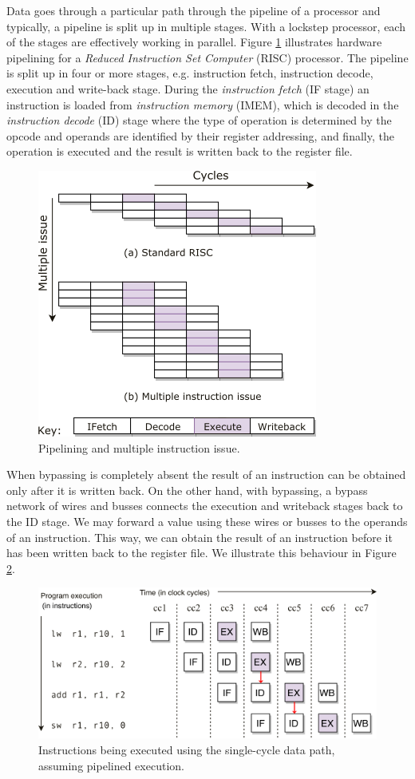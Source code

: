 Data goes through a particular path through the pipeline of a processor and typically, a pipeline is split up in multiple stages. With a lockstep processor, each of the stages are effectively working in parallel. Figure \ref{fig:pipelining} illustrates hardware pipelining for a \emph{Reduced Instruction Set Computer} (RISC) processor. The pipeline is split up in four or more stages, e.g. instruction fetch, instruction decode, execution and write-back stage. During the \emph{instruction fetch} (IF stage) an instruction is loaded from \emph{instruction memory} (IMEM), which is decoded in the \emph{instruction decode} (ID) stage where the type of operation is determined by the opcode and operands are identified by their register addressing, and finally, the operation is executed and the result is written back to the register file.

\begin{figure}[H]
\centering
\includegraphics[width=.5\textwidth]{figures/pipelining}
\caption{Pipelining and multiple instruction issue\cite{tta_codegen}.}
\label{fig:pipelining}
\end{figure}

When bypassing is completely absent the result of an instruction can be obtained only after it is written back. On the other hand, with bypassing, a bypass network of wires and busses connects the execution and writeback stages back to the ID stage. We may forward a value using these wires or busses to the operands of an instruction. This way, we can obtain the result of an instruction before it has been written back to the register file. We illustrate this behaviour in Figure \ref{fig:bypass_problem}.

\begin{figure}[b!]
\centering
\includegraphics[width=.8\textwidth]{figures/bypassing_example}
\caption{Instructions being executed using the single-cycle data path, assuming pipelined execution.}
\label{fig:bypass_problem}
\end{figure}

